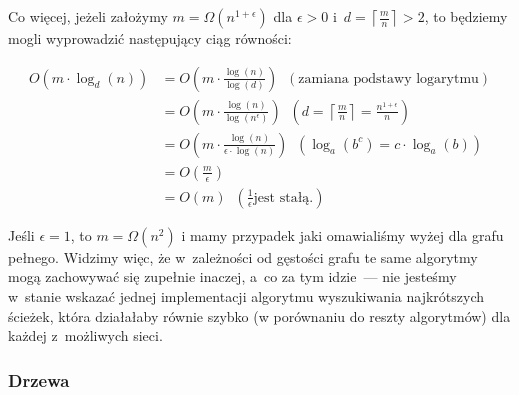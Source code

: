 Co więcej, jeżeli założymy $m = \Omega \left( n^{1+\epsilon} \right)$ dla $\epsilon > 0$ i~$d = \left \lceil \frac{m}{n} \right \rceil > 2$, to będziemy mogli wyprowadzić następujący ciąg równości:

\begin{equation}
	\begin{aligned}
		O \left( m \cdot \log_{d} \left( n \right) \right) &= O \left( m \cdot \frac{\log \left( n \right)}{\log \left( d \right)} \right) \; \; \left( \textrm{zamiana podstawy logarytmu} \right) \\
		&= O \left( m \cdot \frac{\log \left( n \right)}{\log \left( n^{\epsilon} \right)} \right) \; \; \left( d = \left \lceil \frac{m}{n} \right \rceil = \frac{n^{1+\epsilon}}{n} \right) \\
		&= O \left( m \cdot \frac{\log \left( n \right)}{ \epsilon \cdot \log \left( n \right)} \right) \; \; \left( \log_{a} \left( b^{c} \right) = c \cdot \log_{a} \left( b \right) \right) \\
		&= O \left( \frac{m}{\epsilon} \right) \\
		&= O \left( m \right) \; \; \left( \frac{1}{\epsilon} \textrm{jest stałą.} \right)
	\end{aligned}
\end{equation}


Jeśli $\epsilon = 1$, to $m = \Omega \left( n^{2} \right)$ i mamy przypadek jaki omawialiśmy wyżej dla grafu pełnego.
Widzimy więc, że w~zależności od gęstości grafu te same algorytmy mogą zachowywać się zupełnie inaczej, a~co za tym idzie~--- nie jesteśmy w~stanie wskazać jednej implementacji algorytmu wyszukiwania najkrótszych ścieżek, która działałaby równie szybko (w porównaniu do reszty algorytmów) dla każdej z~możliwych sieci.


\subsubsection{Drzewa}


